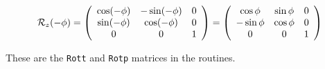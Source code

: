 \[
{\cal R}_z(-\phi)
=
\left(
\begin{array}{ccc}
\cos(-\phi)& -\sin(-\phi) & 0\\
\sin(-\phi)& \cos(-\phi) & 0 \\
0 & 0 & 1 
\end{array}
\right)
=
\left(
\begin{array}{ccc}
\cos\phi& \sin\phi & 0\\
-\sin\phi& \cos\phi & 0 \\
0 & 0 & 1 
\end{array}
\right)
\]

These are the {\tt Rott} and {\tt Rotp} matrices in the routines.



